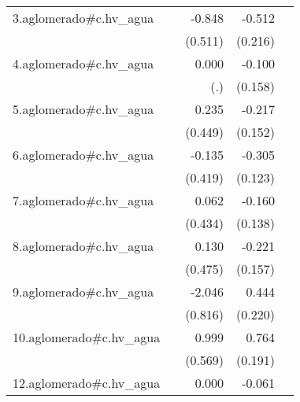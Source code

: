 {\begin{longtable}{l*{4}{D{.}{.}{-1}}}
\addlinespace
3.aglomerado#c.hv\_agua&                     &      -0.848         &      -0.512\sym{*}  &                     \\
            &                     &     (0.511)         &     (0.216)         &                     \\
\addlinespace
4.aglomerado#c.hv\_agua&                     &       0.000         &      -0.100         &                     \\
            &                     &         (.)         &     (0.158)         &                     \\
\addlinespace
5.aglomerado#c.hv\_agua&                     &       0.235         &      -0.217         &                     \\
            &                     &     (0.449)         &     (0.152)         &                     \\
\addlinespace
6.aglomerado#c.hv\_agua&                     &      -0.135         &      -0.305\sym{*}  &                     \\
            &                     &     (0.419)         &     (0.123)         &                     \\
\addlinespace
7.aglomerado#c.hv\_agua&                     &       0.062         &      -0.160         &                     \\
            &                     &     (0.434)         &     (0.138)         &                     \\
\addlinespace
8.aglomerado#c.hv\_agua&                     &       0.130         &      -0.221         &                     \\
            &                     &     (0.475)         &     (0.157)         &                     \\
\addlinespace
9.aglomerado#c.hv\_agua&                     &      -2.046\sym{*}  &       0.444\sym{*}  &                     \\
            &                     &     (0.816)         &     (0.220)         &                     \\
\addlinespace
10.aglomerado#c.hv\_agua&                     &       0.999         &       0.764\sym{***}&                     \\
            &                     &     (0.569)         &     (0.191)         &                     \\
\addlinespace
12.aglomerado#c.hv\_agua&                     &       0.000         &      -0.061         &                     \\

\end{longtable}}
